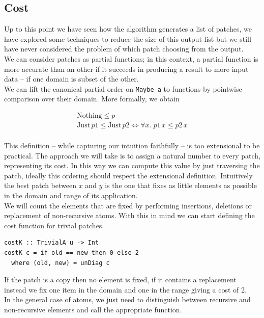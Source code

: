 \documentclass[11pt, titlepage]{article}
\begin{document}
\subsection{Cost}\label{cost}
Up to this point we have seen how the algorithm generates a list of patches, we have explored some techniques to reduce the size of this output list but we still have never considered the problem of which patch choosing from the output.
\\
We can consider patches as partial functions; in this context, a partial function is more accurate than an other if it succeeds in producing a result to more input data -- if one domain is subset of the other.
\\
We can lift the canonical partial order on \texttt{Maybe a} to functions by pointwise comparison over their domain. More formally, we obtain

\begin{center}
\begin{align*}
\mathrm{Nothing} \leq p \\
\mathrm{Just} \, p1 \leq \mathrm{Just} \, p2 \iff  \forall x . \; p1 \, x \leq  p2 \, x \\
\end{align*}
\end{center}
This definition -- while capturing our intuition faithfully -- is too extensional to be practical. The approach we will take is to assign a natural number to every patch, representing its cost. In this way we can compute this value by just traversing the patch, ideally this ordering should respect the extensional definition. Intuitively the best patch between $x$ and $y$ is the one that fixes as little elements as possible in the domain and range of its application.
\\
We will count the elements that are fixed by performing insertions, deletions or replacement of non-recursive atoms. 
With this in mind we can start defining the cost function for trivial patches.

\begin{verbatim}
costK :: TrivialA u -> Int
costK c = if old == new then 0 else 2
  where (old, new) = unDiag c
\end{verbatim}

If the patch is a copy then no element is fixed, if it contains a replacement instead we fix one item in the domain and one in the range giving a cost of 2.
\\
In the general case of atoms, we just need to distinguish between recursive and non-recursive elements and call the appropriate function.
\end{document}
